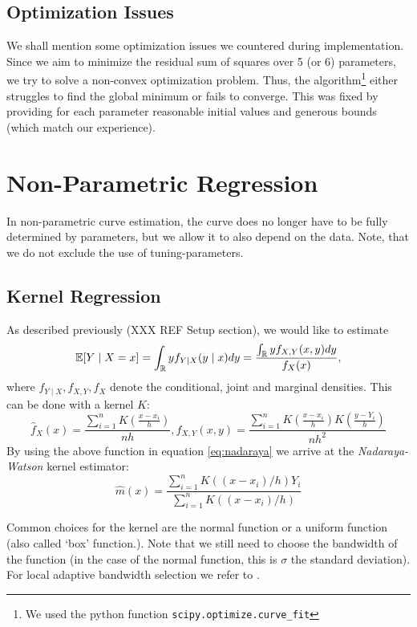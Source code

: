 	\subsection{Optimization Issues}
		We shall mention some optimization issues we countered during implementation. Since we aim to minimize the residual sum of squares over 5 (or 6) parameters, we try to solve a non-convex optimization problem. Thus, the algorithm\footnote{We used the python function \texttt{scipy.optimize.curve\_fit}} either struggles to find the global minimum or fails to converge. This was fixed by providing for each parameter reasonable initial values and generous bounds (which match our experience).

\section{Non-Parametric Regression}
	\label{sec:itpl_nonparametric}
	In non-parametric curve estimation, the curve does no longer have to be fully determined by parameters, but we allow it to also depend on the data. Note, that we do not exclude the use of tuning-parameters.

	\subsection{Kernel Regression}
		\label{sec:Kernel}
		As described previously (XXX REF Setup section), we would like to estimate
		\begin{equation}
			\label{eq:nadaraya}
			\mathbb{E}[Y \mid X=x]
			= \int_{\mathbb{R}} y f_{Y \mid X}(y \mid x) d y
			=\frac{\int_{\mathbb{R}} y f_{X, Y}(x, y) d y}{f_{X}(x)},
		\end{equation}
		where $f_{Y \mid X}, f_{X, Y}, f_{X}$ denote the conditional, joint and marginal densities.
		This can be done with a kernel $K$:
		$$
			\hat{f}_{X}(x)=\frac{\sum_{i=1}^{n} K\left(\frac{x-x_{i}}{h}\right)}{n h}, \hat{f}_{X, Y}(x, y)=\frac{\sum_{i=1}^{n} K\left(\frac{x-x_{i}}{h}\right) K\left(\frac{y-Y_{i}}{h}\right)}{n h^{2}}
		$$
		By using the above function in equation \eqref{eq:nadaraya} we arrive at the \textit{Nadaraya-Watson} kernel estimator:
		$$\hat{m}(x)=\frac{\sum_{i=1}^{n} K\left(\left(x-x_{i}\right) / h\right) Y_{i}}{\sum_{i=1}^{n} K\left(\left(x-x_{i}\right) / h\right)}$$

		Common choices for the kernel are the normal function or a uniform function (also called `box' function.). Note that we still need to choose the bandwidth of the function (in the case of the normal function, this is $\sigma$ the standard deviation). For local adaptive bandwidth selection we refer to \cite{brockmannLocallyAdaptiveBandwidth1993}.

